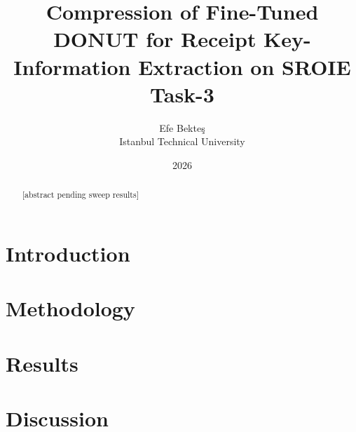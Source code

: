 \documentclass[11pt,a4paper]{article}
\title{Compression of Fine-Tuned DONUT for Receipt Key-Information Extraction on SROIE Task-3}
\author{Efe Bekte\c{s} \\ Istanbul Technical University}
\date{2026}
\begin{document}
\maketitle

\begin{abstract}
[abstract pending sweep results]
\end{abstract}

\section{Introduction}

\section{Methodology}

\section{Results}

\section{Discussion}


% 
\end{document}
